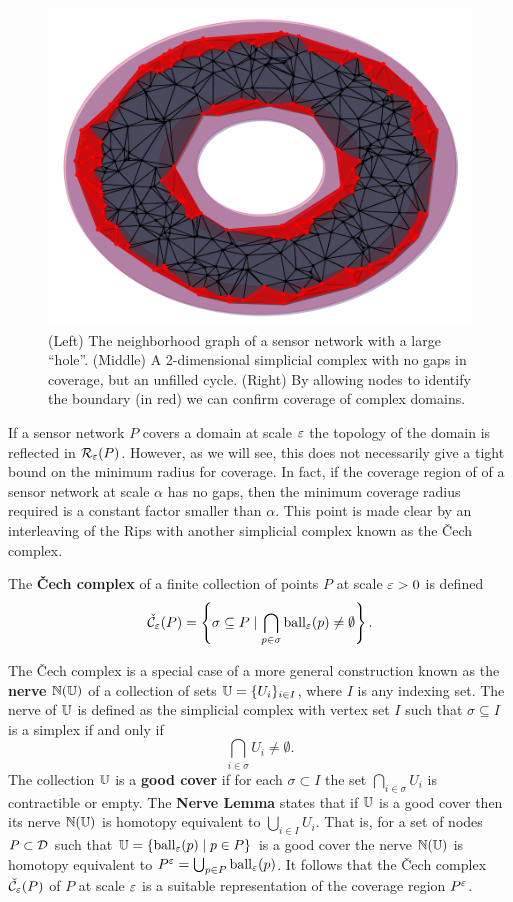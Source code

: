 {\begin{figure}[htbp]
    \includegraphics[scale=0.33]{figures/boundary_complex_domain_fence.pdf}
     \caption{(Left) The neighborhood graph of a sensor network with a large ``hole''.
            (Middle) A 2-dimensional simplicial complex with no gaps in coverage, but an unfilled cycle.
            (Right) By allowing nodes to identify the boundary (in red) we can confirm coverage of complex domains.}
     \label{fig:boundary1}
 \end{figure}}

If a sensor network $P$ covers a domain at scale $\varepsilon$ the topology of the domain is reflected in $\mathcal{R}_\varepsilon(P)$.
However, as we will see, this does not necessarily give a tight bound on the minimum radius for coverage.
In fact, if the coverage region of of a sensor network at scale $\alpha$ has no gaps, then the minimum coverage radius required is a constant factor smaller than $\alpha$.
This point is made clear by an interleaving of the Rips with another simplicial complex known as the \v Cech complex.

\begin{definition}
    The \textbf{\v Cech complex} of a finite collection of points $P$ at scale $\varepsilon > 0$ is defined
    \[ \check{\mathcal{C}}_\varepsilon(P) = \left\{\sigma \subseteq P\mid \bigcap_{p\in \sigma}\mathrm{ball}_\varepsilon(p)\neq \emptyset \right\}. \]
\end{definition}
The \v Cech complex is a special case of a more general construction known as the \textbf{nerve} $\mathbb{N}(\mathbb{U})$ of a collection of sets $\mathbb{U} = \{U_i\}_{i\in I}$, where $I$ is any indexing set.
The nerve of $\mathbb{U}$ is defined as the simplicial complex with vertex set $I$ such that $\sigma\subseteq I$ is a simplex if and only if
\[
  \bigcap_{i\in \sigma} U_i\neq \emptyset.
\]
The collection $\mathbb{U}$ is a \textbf{good cover} if for each $\sigma\subset I$ the set $\bigcap_{i\in\sigma} U_i$ is contractible or empty.
The \textbf{Nerve Lemma} states that if $\mathbb{U}$ is a good cover then its nerve $\mathbb{N}(\mathbb{U})$ is homotopy equivalent to $\bigcup_{i\in I} U_i$.
That is, for a set of nodes $P\subset{\mathcal{D}}$ such that $\mathbb{U} = \{\mathrm{ball}_\varepsilon(p)\mid p\in P\}$ is a good cover the nerve $\mathbb{N}(\mathbb{U})$ is homotopy equivalent to $P^\varepsilon = \bigcup_{p\in P} \mathrm{ball}_\varepsilon(p)$.
It follows that the \v Cech complex $\check{\mathcal{C}}_\varepsilon(P)$ of $P$ at scale $\varepsilon$ is a suitable representation of the coverage region $P^\varepsilon$.

